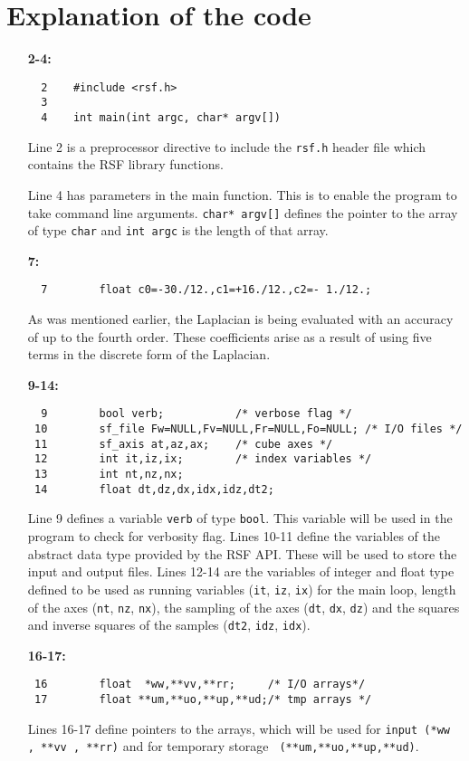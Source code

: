 \section{Explanation of the code}
\begin{itemize}
    \item [\bf 2-4:]
\begin{verbatim}	
  2    #include <rsf.h>
  3
  4    int main(int argc, char* argv[])
\end{verbatim}	
Line 2 is a preprocessor directive to include the \texttt{rsf.h} header file which contains the RSF library functions.

Line 4 has parameters in the main function. This is to enable the program to take command line arguments. \texttt{char* argv[]} defines the pointer to the array of type \texttt{char} and \texttt{int argc} is the length of that array.
	
    \item [\bf 7:]
\begin{verbatim}
  7        float c0=-30./12.,c1=+16./12.,c2=- 1./12.;
\end{verbatim}
As was mentioned earlier, the Laplacian is being evaluated with an accuracy of up to the fourth order. These coefficients arise as a result of using five terms in the discrete form of the Laplacian.   
	
	\item [\bf 9-14:]
\begin{verbatim}
  9        bool verb;           /* verbose flag */
 10        sf_file Fw=NULL,Fv=NULL,Fr=NULL,Fo=NULL; /* I/O files */
 11        sf_axis at,az,ax;    /* cube axes */
 12        int it,iz,ix;        /* index variables */
 13        int nt,nz,nx;
 14        float dt,dz,dx,idx,idz,dt2;
\end{verbatim}

Line 9 defines a variable \texttt{verb} of type \texttt{bool}. This variable will be used in the program to check for verbosity flag. Lines 10-11 define the variables of the abstract data type provided by the RSF API. These will be used to store the input and output files. Lines 12-14 are the variables of integer and float type defined to be used as running variables (\texttt{it}, \texttt{iz}, \texttt{ix}) for the main loop, length of the axes (\texttt{nt}, \texttt{nz}, \texttt{nx}), the sampling of the axes (\texttt{dt}, \texttt{dx}, \texttt{dz}) and the squares and inverse squares of the samples (\texttt{dt2}, \texttt{idz}, \texttt{idx}).

\item [\bf 16-17:]
\begin{verbatim}
 16        float  *ww,**vv,**rr;     /* I/O arrays*/
 17        float **um,**uo,**up,**ud;/* tmp arrays */
   \end{verbatim}
Lines 16-17 define pointers to the arrays, which will be used for \texttt{input (*ww , **vv , **rr)} and for temporary storage \texttt{ (**um,**uo,**up,**ud)}. 


\end{itemize}
